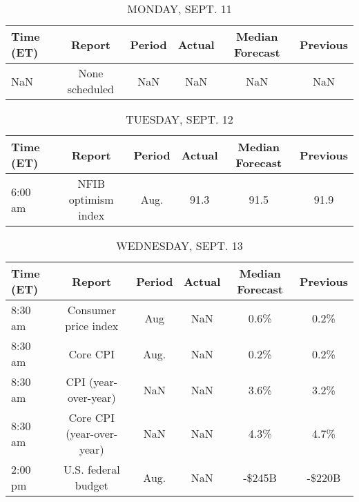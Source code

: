 \documentclass{article}%
\begin{document}
%
\normalsize%


\begin{table}[htbp]%
\caption{MONDAY, SEPT. 11}%
\centering%
\begin{adjustbox}{width=1\textwidth}%
\begin{tabular}{lccccc}
\toprule
Time (ET) &         Report & Period & Actual & Median Forecast & Previous \\
\midrule
      NaN & None scheduled &    NaN &    NaN &             NaN &      NaN \\
\bottomrule
\end{tabular}
%
\end{adjustbox}%
\end{table}

%


\begin{table}[htbp]%
\caption{TUESDAY, SEPT. 12}%
\centering%
\begin{adjustbox}{width=1\textwidth}%
\begin{tabular}{lccccc}
\toprule
Time (ET) &              Report & Period & Actual & Median Forecast & Previous \\
\midrule
  6:00 am & NFIB optimism index &   Aug. &   91.3 &            91.5 &     91.9 \\
\bottomrule
\end{tabular}
%
\end{adjustbox}%
\end{table}

%


\begin{table}[htbp]%
\caption{WEDNESDAY, SEPT. 13}%
\centering%
\begin{adjustbox}{width=1\textwidth}%
\begin{tabular}{lccccc}
\toprule
Time (ET) &                    Report & Period & Actual & Median Forecast & Previous \\
\midrule
  8:30 am &      Consumer price index &    Aug &    NaN &            0.6\% &     0.2\% \\
  8:30 am &                  Core CPI &   Aug. &    NaN &            0.2\% &     0.2\% \\
  8:30 am &      CPI (year-over-year) &    NaN &    NaN &            3.6\% &     3.2\% \\
  8:30 am & Core CPI (year-over-year) &    NaN &    NaN &            4.3\% &     4.7\% \\
  2:00 pm &       U.S. federal budget &   Aug. &    NaN &          -\$245B &   -\$220B \\
\bottomrule
\end{tabular}
%
\end{adjustbox}%
\end{table}
\end{document}
